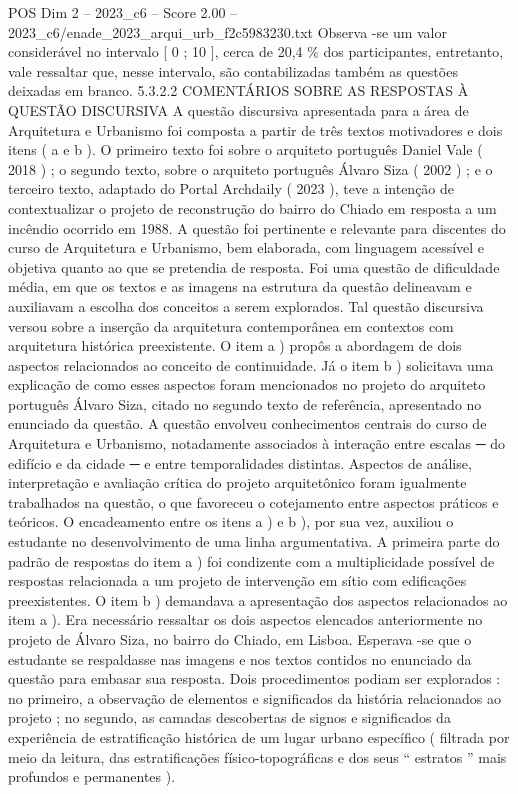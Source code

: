 \begin{textsample}{POS Dim 2 – 2023\_c6 – Score 2.00 – 2023\_c6/enade\_2023\_arqui\_urb\_f2c5983230.txt}
Observa -se um valor considerável no intervalo [ 0 ; 10 ], cerca de 20,4 \% dos participantes, entretanto, vale ressaltar que, nesse intervalo, são contabilizadas também as questões deixadas em branco. 5.3.2.2 COMENTÁRIOS SOBRE AS RESPOSTAS À QUESTÃO DISCURSIVA A questão discursiva apresentada para a área de Arquitetura e Urbanismo foi composta a partir de três textos motivadores e dois itens ( a e b ).
O primeiro texto foi sobre o arquiteto português Daniel Vale ( 2018 ) ; o segundo texto, sobre o arquiteto português Álvaro Siza ( 2002 ) ; e o terceiro texto, adaptado do Portal Archdaily ( 2023 ), teve a intenção de contextualizar o projeto de reconstrução do bairro do Chiado em resposta a um incêndio ocorrido em 1988.
A questão foi pertinente e relevante para discentes do curso de Arquitetura e Urbanismo, bem elaborada, com linguagem acessível e objetiva quanto ao que se pretendia de resposta.
Foi uma questão de dificuldade média, em que os textos e as imagens na estrutura da questão delineavam e auxiliavam a escolha dos conceitos a serem explorados.
Tal questão discursiva versou sobre a inserção da arquitetura contemporânea em contextos com arquitetura histórica preexistente.
O item a ) propôs a abordagem de dois aspectos relacionados ao conceito de continuidade.
Já o item b ) solicitava uma explicação de como esses aspectos foram mencionados no projeto do arquiteto português Álvaro Siza, citado no segundo texto de referência, apresentado no enunciado da questão.
A questão envolveu conhecimentos centrais do curso de Arquitetura e Urbanismo, notadamente associados à interação entre escalas {\EmojiFont ─} do edifício e da cidade {\EmojiFont ─} e entre temporalidades distintas.
Aspectos de análise, interpretação e avaliação crítica do projeto arquitetônico foram igualmente trabalhados na questão, o que favoreceu o cotejamento entre aspectos práticos e teóricos.
O encadeamento entre os itens a ) e b ), por sua vez, auxiliou o estudante no desenvolvimento de uma linha argumentativa.
A primeira parte do padrão de respostas do item a ) foi condizente com a multiplicidade possível de respostas relacionada a um projeto de intervenção em sítio com edificações preexistentes.
O item b ) demandava a apresentação dos aspectos relacionados ao item a ).
Era necessário ressaltar os dois aspectos elencados anteriormente no projeto de Álvaro Siza, no bairro do Chiado, em Lisboa.
Esperava -se que o estudante se respaldasse nas imagens e nos textos contidos no enunciado da questão para embasar sua resposta.
Dois procedimentos podiam ser explorados : no primeiro, a observação de elementos e significados da história relacionados ao projeto ; no segundo, as camadas descobertas de signos e significados da experiência de estratificação histórica de um lugar urbano específico ( filtrada por meio da leitura, das estratificações físico-topográficas e dos seus “ estratos ” mais profundos e permanentes ).

\end{textsample}
